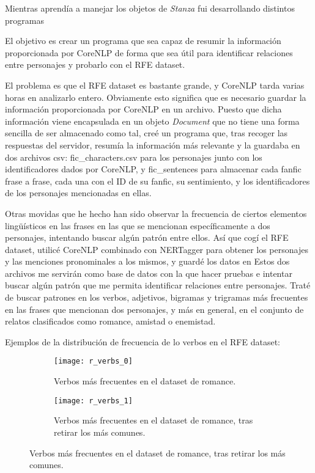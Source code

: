 \documentclass{pre-tfg}
\begin{document}
Mientras aprendía a manejar los objetos de \textit{Stanza} fui desarrollando distintos programas 

El objetivo es crear un programa que sea capaz de resumir la información proporcionada por CoreNLP de forma que sea útil para identificar relaciones entre personajes y probarlo con el RFE dataset.

El problema es que el RFE dataset es bastante grande, y CoreNLP tarda varias horas en analizarlo entero. Obviamente esto significa que es necesario guardar la información proporcionada por CoreNLP en un archivo. Puesto que dicha información viene encapsulada en un objeto \textit{Document} que no tiene una forma sencilla de ser almacenado como tal, creé un programa que, tras recoger las respuestas del servidor, resumía la información más relevante y la guardaba en dos archivos csv: fic\_characters.csv para los personajes junto con los identificadores dados por CoreNLP, y fic\_sentences para almacenar cada fanfic frase a frase, cada una con el ID de su fanfic, su sentimiento, y los identificadores de los personajes mencionadas en ellas.


Otras movidas que he hecho han sido observar la frecuencia de ciertos elementos lingüísticos en las frases en las que se mencionan específicamente a dos personajes, intentando buscar algún patrón entre ellos. Así que cogí el RFE dataset, utilicé CoreNLP combinado con NERTagger para obtener los personajes y las menciones pronominales a los mismos, y guardé los datos en 
Estos dos archivos me servirán como base de datos con la que hacer pruebas e intentar buscar algún patrón que me permita identificar relaciones entre personajes. Traté de buscar patrones en los verbos, adjetivos, bigramas y trigramas más frecuentes en las frases que mencionan dos personajes, y más en general, en el conjunto de relatos clasificados como romance, amistad o enemistad.

Ejemplos de la distribución de frecuencia de lo verbos en el RFE dataset:

\begin{figure}
	\centering
	\begin{subfigure}{\textwidth}
		\texttt{[image: r\_verbs\_0]}
		\caption{Verbos más frecuentes en el dataset de romance.}
		\label{fig:r_verb_freq_in_dataset}
		
	\end{subfigure}
	\begin{subfigure}{\textwidth}
		\texttt{[image: r\_verbs\_1]}
		\caption{Verbos más frecuentes en el dataset de romance, tras retirar los más comunes.}
		\label{fig:r_verb_freq_removed}
	\end{subfigure}
	
	
\end{figure}
\end{document}
